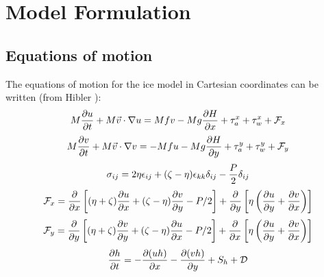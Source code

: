 \chapter{Model Formulation}
\label{Phys}
\section {Equations of motion}
The equations of motion for the ice model in Cartesian coordinates can
be written (from Hibler \cite{Hibler79}):
\begin{equation}
  M {\partial u \over \partial t} + M \vec{v} \cdot \nabla u = Mfv
  - Mg {\partial H \over \partial x} + \tau_a^x + \tau_w^x + {\cal F}_x
\label{st1}
\end{equation}
\vspace{.2cm}
\begin{equation}
  M {\partial v \over \partial t} + M \vec{v} \cdot \nabla v = - Mfu
  - Mg {\partial H \over \partial y} + \tau_a^y + \tau_w^y + {\cal F}_y
\label{st2}
\end{equation}
\vspace{.2cm}
\begin{equation}
  \sigma_{ij} = 2 \eta \epsilon_{ij} + (\zeta - \eta) \epsilon_{kk}
  \delta_{ij} - {P \over 2} \delta_{ij}
\label{stress1}
\end{equation}
\vspace{.2cm}
\begin{equation}
   {\cal F}_x = {\partial \over \partial x} \left[ (\eta + \zeta)
   {\partial u \over \partial x} + (\zeta - \eta)
   {\partial v \over \partial y} - P/2 \right] +
   {\partial \over \partial y} \left[ \eta \left( 
   {\partial u \over \partial y} + {\partial v \over \partial x}
   \right) \right]
\label{fx1}
\end{equation}
\vspace{.2cm}
\begin{equation}
   {\cal F}_y = {\partial \over \partial y} \left[ (\eta + \zeta)
   {\partial v \over \partial y} + (\zeta - \eta)
   {\partial u \over \partial x} - P/2 \right] +
   {\partial \over \partial x} \left[ \eta \left( 
   {\partial u \over \partial y} + {\partial v \over \partial x}
   \right) \right]
\label{fy1}
\end{equation}
\vspace{.2cm}
\begin{equation}
  {\partial h \over \partial t} =
  - {\partial (uh) \over \partial x} - {\partial (vh) \over \partial y}
  + S_h + {\cal D}
\label{st3a}
\end{equation}
